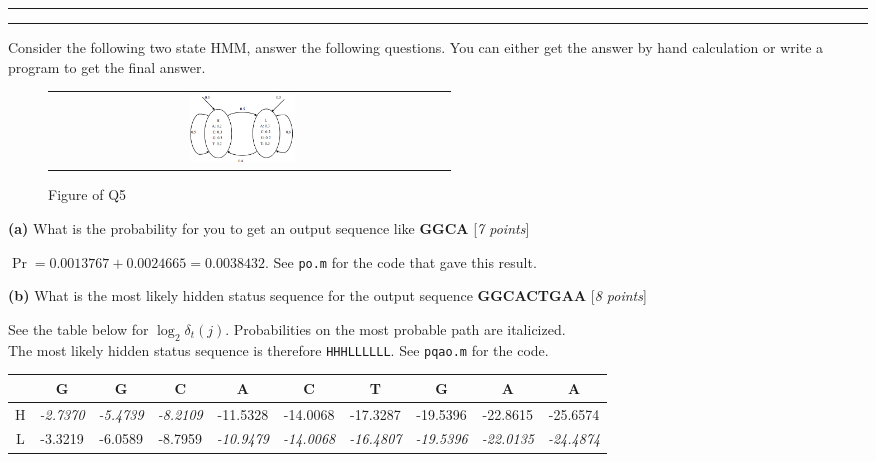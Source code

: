 \documentclass[11pt]{article}
\newcounter{marks}
\def\maxmarks#1{\extramark{#1}\addtocounter{marks}{#1}}
\def\extramark#1{\hfill
  [\emph{#1 points}]
}
\newcommand{\myfirstta}{Kuo Liu}
\newcommand{\question}[2] {\vspace{.25in} \hrule\vspace{0.5em} \noindent{\bf #1: #2} \vspace{0.5em} \hrule \vspace{.10in}}
\renewcommand{\part}[1] {\vspace{.10in} {\bf (#1)}}
\begin{document}
\clearpage

\question{5} {HMM II (TA:- \myfirstta)}
 Consider the following two state HMM, answer the following questions. You can either get the answer by hand calculation or write a program to get the final answer.\\

\begin{figure}[h]
\centering
\begin{tabular}{cc}
\includegraphics[width = 0.28\textwidth]{q5.jpg}& 
\end{tabular}
\caption{Figure of Q5}\label{fig:GNB}
\end{figure}

\part{a}
What is the probability for you to get an output sequence like \textbf{GGCA}
\maxmarks{7}

{\color{blue} 
$\Pr=0.0013767+0.0024665=0.0038432$. See {\tt po.m} for the code that gave this result.
}


\part{b}
What is the most likely hidden status sequence for the output sequence \textbf{GGCACTGAA}
\maxmarks{8}

{\color{blue}
See the table below for $\log_2\delta_t(j)$. Probabilities on the most probable path are italicized. \\
The most likely hidden status sequence is therefore {\tt HHHLLLLLL}. See {\tt pqao.m} for the code. 
\begin{table}[h!]
	\centering
	\begin{tabular}{cccccccccc} \toprule
	& G & G & C & A & C & T & G & A & A \\ \midrule
   H &\emph{-2.7370} & \emph{-5.4739} & \emph{-8.2109} &-11.5328 
   &-14.0068 &-17.3287 &-19.5396 &-22.8615 &-25.6574\\
   L &-3.3219 &-6.0589 &-8.7959 &\emph{-10.9479} &\emph{-14.0068} & \emph{-16.4807} & 
   \emph{-19.5396} & \emph{-22.0135} & \emph{-24.4874}
   	\\ \bottomrule
	\end{tabular}
\end{table}
}





\clearpage		
\end{document}
